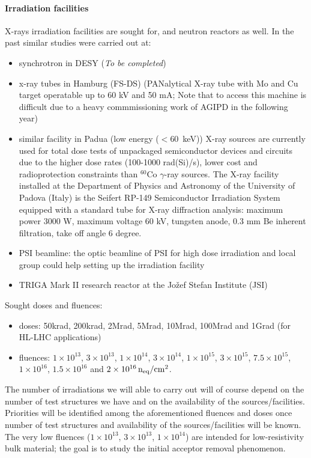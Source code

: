 \documentclass[dvips,12pt]{article}
\begin{document}
\paragraph{Irradiation facilities}
X-rays irradiation facilities are sought for, and neutron reactors as well.
In the past similar studies were carried out at:
\begin{itemize}
\item synchrotron in DESY ({\it To be completed})
\item x-ray tubes in Hamburg (FS-DS) (PANalytical X-ray tube with Mo and Cu target operatable up to 60 kV and 50 mA; Note that to access this machine is difficult due to a heavy commmissioning work of AGIPD in the following year)
\item similar facility in Padua (low energy ($<$60~keV)) X-ray sources are currently used for total dose tests of unpackaged semiconductor devices and circuits due to the higher dose rates (100-1000 rad(Si)/s), lower cost and radioprotection constraints than $^{60}$Co $\gamma$-ray sources.
The X-ray facility installed at the Department of Physics and Astronomy of the University of Padova (Italy) is the Seifert RP-149 Semiconductor Irradiation System equipped with a standard tube for X-ray diffraction analysis: maximum power 3000 W, maximum voltage 60 kV, tungsten anode, 0.3 mm Be inherent filtration, take off angle 6 degree. 
\item PSI beamline: the optic beamline of PSI for high dose irradiation and local group could help 
setting up the irradiation facility 
\item TRIGA Mark II research reactor at the Jo\v{z}ef Stefan Institute (JSI)  
\end{itemize}
\noindent Sought doses and fluences:
\begin{itemize}
\item doses: 50krad, 200krad, 2Mrad, 5Mrad, 10Mrad, 100Mrad and 1Grad (for HL-LHC 
applications)
\item fluences: $1\times10^{13}$,  $3\times10^{13}$, $1\times10^{14}$, $3\times10^{14}$, 
$1\times10^{15}$, $3\times10^{15}$, $7.5\times10^{15}$, $1\times10^{16}$, $1.5\times10^{16}$ and 
$2\times10^{16}\,{\rm n_{eq}/cm^2}$.
\end{itemize}

\noindent The number of irradiations we will able to carry out will of course depend on the 
number of test structures we have and on the availability of the sources/facilities. Priorities 
will be identified among the aforementioned fluences and doses once number of test structures 
and  availability of the sources/facilities will be known. 
\noindent The very low fluences ($1\times10^{13}$,  
$3\times10^{13}$, $1\times10^{14}$) are intended for low-resistivity bulk material; the goal 
is to study the initial acceptor removal phenomenon. 
\end{document}
